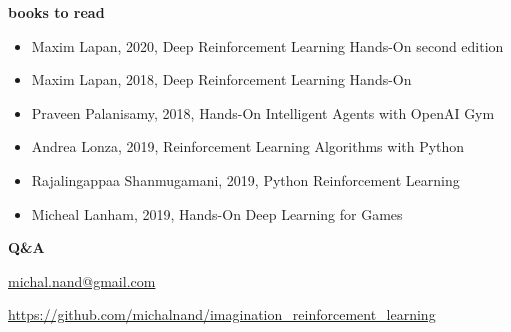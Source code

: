 \documentclass[xcolor=dvipsnames]{beamer}
\begin{document}
\begin{frame}{\bf books to read}

        \begin{itemize}
          \item Maxim Lapan, 2020, Deep Reinforcement Learning Hands-On second edition
          \item Maxim Lapan, 2018, Deep Reinforcement Learning Hands-On
          \item Praveen Palanisamy, 2018, Hands-On Intelligent Agents with OpenAI Gym
          \item Andrea Lonza, 2019, Reinforcement Learning Algorithms with Python
          \item Rajalingappaa Shanmugamani, 2019, Python Reinforcement Learning
          \item Micheal Lanham, 2019, Hands-On Deep Learning for Games
        \end{itemize}

\end{frame}


\begin{frame}{\bf Q\&A}


\url{michal.nand@gmail.com}

\url{https://github.com/michalnand/imagination_reinforcement_learning}

 
\end{frame}
\end{document}
